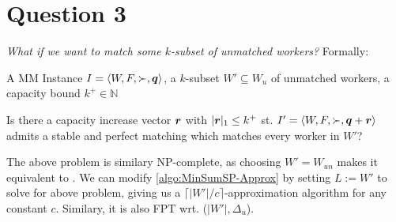 \section{Question 3}

\textit{What if we want to match some $k$-subset of unmatched workers?} Formally:

\begin{pinput}
  A MM Instance $I = \left< W, F, \succ, \boldsymbol{q} \right>$, a $k$-subset $W' \subseteq W_u$ of unmatched workers, a capacity bound $k^+ \in \mathbb{N}$
\end{pinput}
\begin{question}
  Is there a capacity increase vector $\boldsymbol{r}$ with $|\boldsymbol{r}|_1 \leq k^+$ st. $I' = \left< W, F, \succ, \boldsymbol{q} + \boldsymbol{r} \right>$ admits a stable and perfect matching which matches every worker in $W'$?
\end{question}

The above problem is similary NP-complete, as choosing $W' = W_{un}$ makes it equivalent to \MinSumSP. We can modify \autoref{algo:MinSumSP-Approx} by setting $L := W'$ to solve for above problem, giving us a $\lceil |W'|/c \rceil$-approximation algorithm for any constant $c$. Similary, it is also FPT wrt. ($|W'|, \Delta_u$).